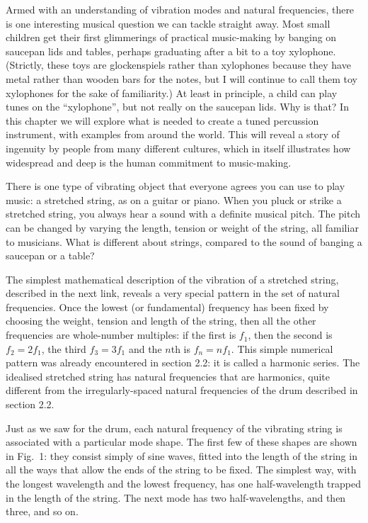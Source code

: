   Armed with an understanding of vibration modes and natural frequencies, there 
  is one interesting musical question we can tackle straight away. Most small 
  children get their first glimmerings of practical music-making by banging on 
  saucepan lids and tables, perhaps graduating after a bit to a toy xylophone. 
  (Strictly, these toys are glockenspiels rather than xylophones because they 
  have metal rather than wooden bars for the notes, but I will continue to call 
  them toy xylophones for the sake of familiarity.) At least in principle, a 
  child can play tunes on the ``xylophone'', but not really on the saucepan 
  lids. Why is that? In this chapter we will explore what is needed to create a 
  tuned percussion instrument, with examples from around the world. This will 
  reveal a story of ingenuity by people from many different cultures, which in 
  itself illustrates how widespread and deep is the human commitment to 
  music-making. 

  There is one type of vibrating object that everyone agrees you can use to 
  play music: a stretched string, as on a guitar or piano. When you pluck or 
  strike a stretched string, you always hear a sound with a definite musical 
  pitch. The pitch can be changed by varying the length, tension or weight of 
  the string, all familiar to musicians. What is different about strings, 
  compared to the sound of banging a saucepan or a table? 

  The simplest mathematical description of the vibration of a stretched string, 
  described in the next link, reveals a very special pattern in the set of 
  natural frequencies. Once the lowest (or fundamental) frequency has been 
  fixed by choosing the weight, tension and length of the string, then all the 
  other frequencies are whole-number multiples: if the first is $f_1$, then the 
  second is $f_2=2f_1$, the third $f_3=3f_1$ and the $n$th is $f_n=nf_1$. This 
  simple numerical pattern was already encountered in section 2.2: it is called 
  a harmonic series. The idealised stretched string has natural frequencies 
  that are harmonics, quite different from the irregularly-spaced natural 
  frequencies of the drum described in section 2.2. 

  Just as we saw for the drum, each natural frequency of the vibrating string 
  is associated with a particular mode shape. The first few of these shapes are 
  shown in Fig.\ 1: they consist simply of sine waves, fitted into the length 
  of the string in all the ways that allow the ends of the string to be fixed. 
  The simplest way, with the longest wavelength and the lowest frequency, has 
  one half-wavelength trapped in the length of the string. The next mode has 
  two half-wavelengths, and then three, and so on. 

